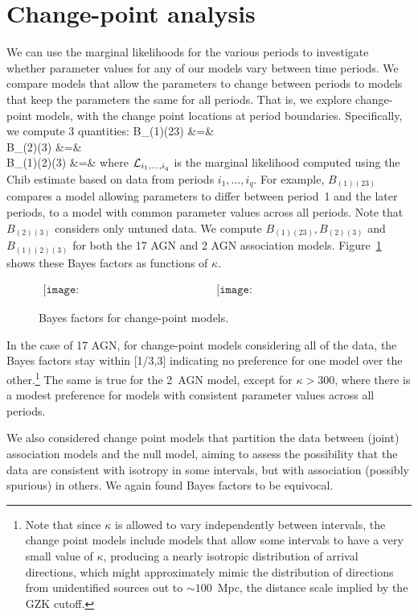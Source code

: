 \section{Change-point analysis}
\label{app:chgpt}

We can use the marginal likelihoods for the various periods to investigate
whether parameter values for any of our models vary between time periods. 
We compare models that allow the parameters to change between periods to
models that keep the parameters the same for all periods.  That is, we
explore change-point models, with the change point locations at period
boundaries.  Specifically, we compute 3 quantities:
\ba
B_{(1)(23)} &=& \nonumber\\
B_{(2)(3)} &=& \nonumber\\
B_{(1)(2)(3)} &=& 
\ea
where ${\cal L}_{i_1,\ldots,i_q}$ is the marginal likelihood computed using
the Chib estimate based on data from periods $i_1,\ldots,i_q$.
For example, $B_{(1)(23)}$ compares a model allowing parameters to differ
between period~1 and the later periods, to a model with common parameter
values across all periods.  Note that $B_{(2)(3)}$ considers only untuned
data.  We compute $B_{(1)(23)}, B_{(2)(3)}$ and $B_{(1)(2)(3)}$ for both the
17 AGN and 2 AGN association models. Figure~\ref{fig:changepoint} shows
these Bayes factors as functions of $\kappa$.

\begin{figure}
\centerline{$
\begin{array}{cc}
\texttt{[image: BF\_changepoint\_17AGNs.eps]} &
\texttt{[image: BF\_changepoint\_2AGNs.eps]}
\end{array}$}
\caption{Bayes factors for change-point models.}
\label{fig:changepoint}
\end{figure}

In the case of 17 AGN, for change-point models considering all of the data,
the Bayes factors stay within [1/3,3] indicating no preference for one model
over the other.\footnote{Note that since $\kappa$
is allowed to vary independently between intervals, the change point
models include models that allow some intervals to have a very small
value of $\kappa$, producing a nearly isotropic distribution of arrival
directions, which might approximately mimic the distribution of directions
from unidentified sources out to $\sim 100$~Mpc, the distance scale
implied by the GZK cutoff.}
The same is true for the 2~AGN model, except for
$\kappa > 300$, where there is a modest preference for models with
consistent parameter values across all periods.

We also considered change point models that partition the data between
(joint) association models and the null model, aiming to assess the
possibility that the data are consistent with isotropy in some intervals,
but with association (possibly spurious) in others.  We again found
Bayes factors to be equivocal.  
